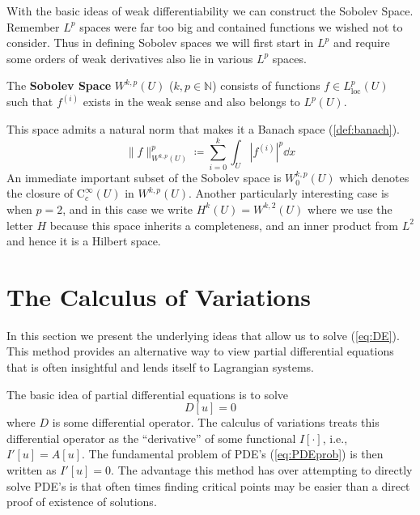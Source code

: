 With the basic ideas of weak differentiability we can construct the Sobolev
Space. Remember \(L^p\) spaces were far too big and contained functions we
wished not to consider. Thus in defining Sobolev spaces we will first start in
\(L^p\) and require some orders of weak derivatives also lie in various \(L^p\)
spaces.
\begin{definition}
    The \textbf{Sobolev Space} \(W^{k,p}(U)\) (\(k,p\in\mathbb{N}\)) consists of
    functions \(f\in L^p_\mathrm{loc}(U)\) such that \(f^{(i)}\) exists in the
    weak sense and also belongs to \(L^p(U)\).
\end{definition}
This space admits a natural norm that makes it a Banach space (\ref{def:banach}).
\begin{equation}
    \|f\|_{W^{k,p}(U)}^p \coloneqq \sum_{i = 0}^k\int_U |f^{(i)}|^p\dd{x}
\end{equation}
An immediate important subset of the Sobolev space is \(W^{k,p}_0(U)\) which
denotes the closure of \(\mathrm{C}^\infty_c(U)\) in \(W^{k,p}(U)\). Another
particularly interesting case is when \(p = 2\), and in this case we write
\(H^k(U) = W^{k,2}(U)\) where we use the letter \(H\) because this space
inherits a completeness, and an inner product from \(L^2\) and hence it is a
Hilbert space.

\section{The Calculus of Variations}\label{sec:cov}
In this section we present the underlying ideas that allow us to solve
(\ref{eq:DE}). This method provides an alternative way to view partial
differential equations that is often insightful and lends itself to Lagrangian
systems.

The basic idea of partial differential equations is to solve
\begin{equation}\label{eq:PDEprob}
    D[u] = 0
\end{equation}
where \(D\) is some differential operator. The calculus of variations treats
this differential operator as the ``derivative'' of some functional
\(I[\cdot]\), i.e., \(I'[u] = A[u]\). The fundamental problem of PDE's
(\ref{eq:PDEprob}) is then written as \(I'[u] = 0\). The advantage this method
has over attempting to directly solve PDE's is that often times finding critical
points may be easier than a direct proof of existence of solutions.

